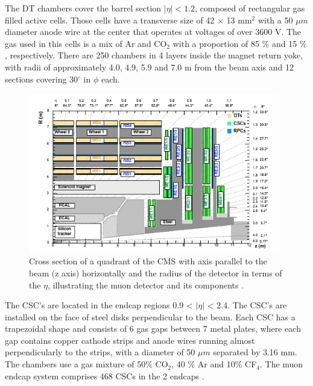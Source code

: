  
The DT chambers cover the barrel section $|\eta|<1.2$, composed of rectangular gas filled active cells. Those cells have a transverse size of 42 $\times$ 13 mm$^2$ with a 50 $\mu m$ diameter anode wire at the center that operates at voltages of over 3600 V. The gas used in this cells is a mix of Ar and CO$_2$ with a proportion of 85 $\%$ and 15 $\%$, respectively. There are 250 chambers in 4 layers inside the magnet return yoke, with radii of approximately 4.0, 4.9, 5.9 and 7.0 m from the beam axis and 12 sections covering 30$^\circ$ in $\phi$ each.

\begin{figure}[ht]
	\centering
	\includegraphics[width=11cm,height=7cm]{Chapter2/csc}
	\caption[CMS Muon detector]{Cross section of a quadrant of the CMS with axis parallel to the beam (z axis) horizontally and the radius of the detector in terms of the $\eta$, illustrating the muon detector and its components \cite{cms-manual}.}
	\label{dt}
\end{figure}

The CSC's are located in the endcap regions 0.9 < $|\eta|$ < 2.4. The CSC's are installed on the face of steel disks perpendicular to the beam. 
Each CSC has a trapezoidal shape and consists of 6 gas gaps between 7 metal plates, where each gap contains copper cathode strips and anode wires running almost perpendicularly to
the strips, with a diameter of 50 $\mu m$ separated by 3.16 mm. 
The chambers use a gas mixture of 50$\%$ CO$_2$, 40 $\%$ Ar and 10$\%$ CF$_4$. The muon endcap system comprises 468 CSCs in the 2 endcaps \cite{cms-manual,cms7}.


